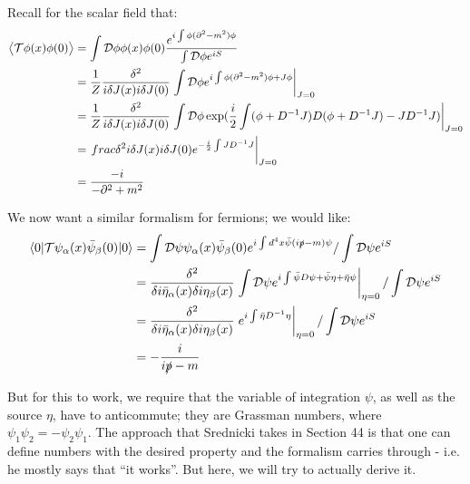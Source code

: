 Recall for the scalar field that:
\begin{equation}
    \begin{split}
        \left< \mathcal{T}\phi(x)\phi(0) \right> &= \int \mathcal{D}\phi \phi(x)\phi(0)\frac{e^{i\int \phi(\partial^2 - m^2)\phi}}{\int \mathcal{D}\phi e^{iS}}
        \\ &= \frac{1}{Z}\frac{\delta^2}{i\delta J(x) i\delta J(0)} \left.\int \mathcal{D}\phi e^{i\int \phi(\partial^2 - m^2)\phi + J\phi}\right|_{J = 0}
        \\ &= \frac{1}{Z}\frac{\delta^2}{i\delta J(x) i\delta J(0)} \left.\int \mathcal{D}\phi \exp(\frac{i}{2}\int (\phi + D^{-1}J)D(\phi + D^{-1}J) - JD^{-1}J)\right|_{J=0}
        \\ &= \left.frac{\delta^2}{i\delta J(x) i\delta J(0)} e^{-\frac{i}{2}\int JD^{-1}J}\right|_{J=0}
        \\ &= \frac{-i}{-\partial^2 + m^2}
    \end{split}
\end{equation}

We now want a similar formalism for fermions; we would like:
\begin{equation}
    \begin{split}
        \langle 0 \rvert\mathcal{T}\psi_{\alpha}(x)\bar{\psi}_\beta(0)\lvert 0 \rangle &= \int \mathcal{D}\psi \psi_{\alpha}(x)\bar{\psi}_{\beta}(0)e^{i\int d^4x \bar{\psi}(i\slashed{p} - m)\psi}/\int \mathcal{D}\psi e^{iS}
        \\ &= \frac{\delta^2}{\delta i \bar{\eta}_{\alpha}(x) \delta i \eta_{\beta}(x)}\left.\int \mathcal{D}\psi e^{i\int \bar{\psi} D \psi + \bar{\psi}\eta + \bar{\eta}\psi}\right|_{\eta=0}/\int \mathcal{D}\psi e^{iS}
        \\ &= \frac{\delta^2}{\delta i \bar{\eta}_{\alpha}(x) \delta i \eta_{\beta}(x)}\left.e^{i\int \bar{\eta}D^{-1}\eta}\right|_{\eta=0}/\int \mathcal{D}\psi e^{iS}
        \\ &= -\frac{i}{i\slashed{p} - m}
    \end{split}
\end{equation}

But for this to work, we require that the variable of integration $\psi$, as well as the source $\eta$, have to anticommute; they are Grassman numbers, where $\psi_1\psi_2 = -\psi_2\psi_1$. The approach that Srednicki takes in Section 44 is that one can define numbers with the desired property and the formalism carries through - i.e. he mostly says that ``it works''. But here, we will try to actually derive it.

